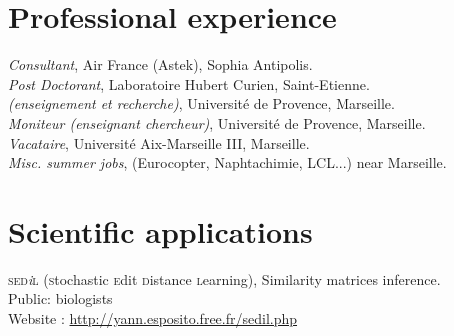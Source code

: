 


\reversemarginpar



\afficheContactInfos

\section*{Professional experience}

\noindent{}\emph{Consultant}, Air France (Astek), Sophia Antipolis.\\
\emph{Post Doctorant}, Laboratoire Hubert Curien, Saint-Etienne.\\
\emph{ {\footnotesize (enseignement et recherche)}}, Université de Provence, Marseille.\\
\emph{Moniteur (enseignant \amper{} chercheur)}, Université de Provence, Marseille.\\
\emph{Vacataire}, Université Aix-Marseille III, Marseille.\\
\emph{Misc. summer jobs}, {\footnotesize (Eurocopter, Naphtachimie, LCL...) } near Marseille.

\section*{Scientific applications}
\textsc{sed}\textit{\footnotesize i}\textsc{l} ({\textsc{\color{darkred}s}tochastic 
\textsc{\color{darkred}e}dit
\textsc{\color{darkred}d}{\color{darkred}i}stance
\textsc{\color{darkred}l}earning}), 
Similarity matrices inference.\\
{\footnotesize \phantom{espace}Public: biologists}\\
{\footnotesize \phantom{espace}Website : \href{http://yann.esposito.free.fr/sedil.php}{http://yann.esposito.free.fr/sedil.php}}

